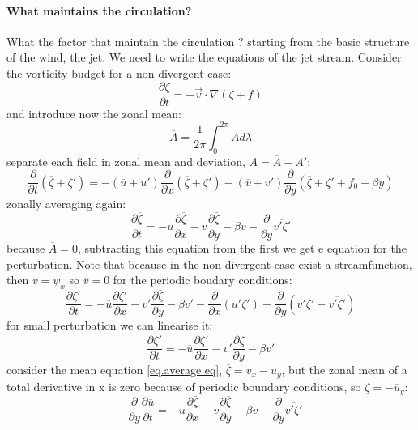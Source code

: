 \paragraph{What maintains the circulation?} What the factor that maintain the circulation ? starting from the basic structure of the wind, the jet. We need to write the equations of the jet stream. Consider the vorticity budget for a non-divergent case:
\begin{equation}
	\frac{\partial\zeta}{\partial t}=-\vec{v}\cdot\nabla(\zeta+f)
\end{equation}
and introduce now the zonal mean:
\begin{equation}\label{eq.zonal mean}
	\overline{A}=\frac{1}{2\pi}\int_0^{2\pi}Ad\lambda
\end{equation}
separate each field in zonal mean and deviation, $A=\overline{A}+A'$:
$$\frac{\partial}{\partial t}(\overline{\zeta}+\zeta')=-(\overline{u}+u')\frac{\partial}{\partial x}(\overline{\zeta}+\zeta')-(\overline{v}+v')\frac{\partial}{\partial y}(\overline{\zeta}+\zeta'+f_0+\beta y)$$
zonally averaging again:
\begin{equation}\label{eq.average eq}
	\frac{\partial\overline{\zeta}}{\partial t}=-\overline{u}\frac{
		\partial\overline{\zeta}
	}{\partial x}-\overline{v}\frac{\partial\overline{\zeta}}{\partial y}-\beta \overline{v}-\frac{\partial}{\partial y}\overline{v'\zeta'}
\end{equation}
because $\overline{A}=0$, subtracting this equation from the first we get e equation for the perturbation. Note that because in the non-divergent case exist a streamfunction, then $v=\psi_x$ so $\overline{v}=0$ for the periodic boudary conditions:
$$\frac{\partial\zeta'}{\partial t}=-\overline{u}\frac{\partial\zeta'}{\partial x}-v'\frac{\partial\overline{\zeta}}{\partial y}-\beta v'-\frac{\partial}{\partial x}(u'\zeta')-\frac{\partial}{\partial y}(v'\zeta'-\overline{v'\zeta'})$$ for small perturbation we can linearise it:
\begin{equation}
	\frac{\partial\zeta'}{\partial t}=-\overline{u}\frac{\partial\zeta'}{\partial x}-v'\frac{\partial\overline{\zeta}}{\partial y}-\beta v'
\end{equation}
consider the mean equation \ref{eq.average eq}, $\overline{\zeta}=\overline{v}_x-\overline{u}_y$, but the zonal mean of a total derivative in x is zero because of periodic boundary conditions, so $\overline{\zeta}=-\overline{u}_y$:
$$-\frac{\partial}{\partial y}\frac{\partial\overline{u}}{\partial t}=-\overline{u}\frac{\partial\overline{\zeta}}{\partial x}-\overline{v}\frac{\partial\overline{\zeta}}{\partial y}-\beta\overline{v}-\frac{\partial}{\partial y}\overline{v'\zeta'}$$
